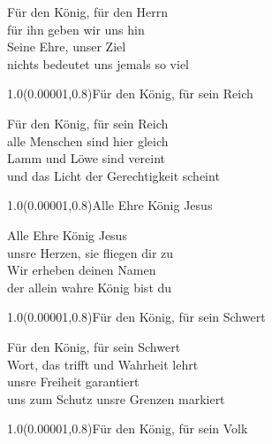 \documentclass[aspectratio=169]{beamer}
\begin{document}
\color{white}
\begin{frame}
\centering
\color{white}
\huge{Für den König, für den Herrn} \\
\huge{für ihn geben wir uns hin} \\
\huge{Seine Ehre, unser Ziel} \\
\huge{nichts bedeutet uns jemals so viel} \\

\begin{textblock}{1.0}(0.00001,0.8)\color{gray}\normalsize{Für den König, für sein Reich}\end{textblock}
\end{frame}

\begin{frame}
\centering
\color{white}
\huge{Für den König, für sein Reich} \\
\huge{alle Menschen sind hier gleich} \\
\huge{Lamm und Löwe sind vereint} \\
\huge{und das Licht der Gerechtigkeit scheint} \\

\begin{textblock}{1.0}(0.00001,0.8)\color{gray}\normalsize{Alle Ehre König Jesus}\end{textblock}
\end{frame}

\begin{frame}
\centering
\color{white}
\huge{Alle Ehre König Jesus} \\
\huge{unsre Herzen, sie fliegen dir zu} \\
\huge{Wir erheben deinen Namen} \\
\huge{der allein wahre König bist du} \\

\begin{textblock}{1.0}(0.00001,0.8)\color{gray}\normalsize{Für den König, für sein Schwert}\end{textblock}
\end{frame}

\begin{frame}
\centering
\color{white}
\huge{Für den König, für sein Schwert} \\
\huge{Wort, das trifft und Wahrheit lehrt} \\
\huge{unsre Freiheit garantiert} \\
\huge{uns zum Schutz unsre Grenzen markiert} \\

\begin{textblock}{1.0}(0.00001,0.8)\color{gray}\normalsize{Für den König, für sein Volk}\end{textblock}
\end{frame}
\end{document}
